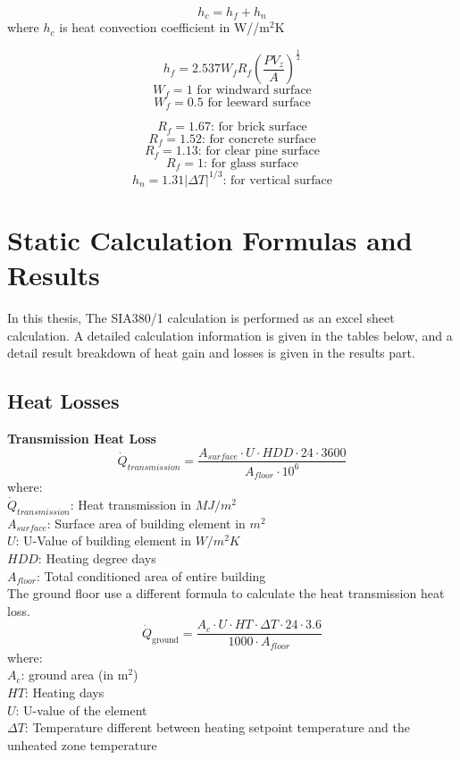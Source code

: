\documentclass[a4paper, oneside]{discothesis}
\begin{document}
	\[h_c = h_f + h_n\]
	where $h_c$ is heat convection coefficient in W//m$^2$K

	\[h_f = 2.537 W_f R_f \left(\frac{PV_z}{A}\right)^\frac{1}{2}\]
	\[W_f = 1  \text{   for windward surface}\]
	\[W_f = 0.5 \text{   for leeward surface}\]

	\[R_f = 1.67 \text{: for brick surface}\]
	\[R_f = 1.52 \text{: for concrete surface}\]
	\[R_f = 1.13 \text{: for clear pine surface}\]
	\[R_f = 1 \text{: for glass surface}\]
	\[h_n = 1.31 | \Delta T|^{1/3} \text{: for vertical surface}\]
	

\chapter{Static Calculation Formulas and Results}\label{sec:siacalculation}
	In this thesis, The SIA380/1 calculation is performed as an excel sheet calculation. A detailed calculation information is given in the tables below, and a detail result breakdown of heat gain and losses is given in the results part.
	\section{Heat Losses}
	\textbf{Transmission Heat Loss}\\

		\[\dot{Q}_{transmission} =\frac{ A_{surface} \cdot U \cdot HDD \cdot 24 \cdot 3600}{A_{floor} \cdot 10^6}\]
		where:\\
		$\dot{Q}_{transmission}$: Heat transmission in $MJ/m^2$\\
		$A_{surface}$: Surface area of building element in $m^2$\\
		$U$: U-Value of building element in $ W/m^2K$\\
		$HDD$: Heating degree days\\
		$A_{floor}$: Total conditioned area of entire building\\

		The ground floor use a different formula to calculate the heat transmission heat loss.
		\[\dot{Q}_{\text{ground}} = \frac{ A_{c} \cdot U \cdot HT \cdot \Delta T \cdot 24 \cdot 3.6}{1000 \cdot A_{floor}}\]
		where:\\
		$A_c$: ground area (in m$^2$)\\
		$HT$: Heating days\\
		$U$: U-value of the element\\
		$\Delta T$: Temperature different between heating setpoint temperature and the unheated zone temperature\\
\end{document}

